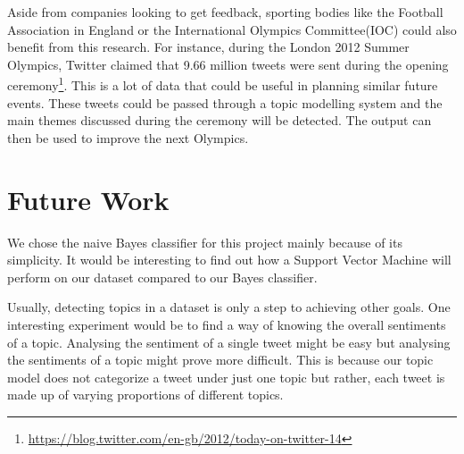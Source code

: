 Aside from companies looking to get feedback, sporting bodies like the Football Association in
England or the International Olympics Committee(IOC) could also benefit from this research. For
instance, during the London 2012 Summer Olympics, Twitter claimed that 9.66 million tweets were sent
during the opening ceremony\footnote{\url{https://blog.twitter.com/en-gb/2012/today-on-twitter-14}}.
This is a lot of data that could be useful in planning similar future events. These tweets could be
passed through a topic modelling system and the main themes discussed during the ceremony will be
detected. The output can then be used to improve the next Olympics.


\section{Future Work}
We chose the naive Bayes classifier for this project mainly because of its simplicity. It would be
interesting to find out how a Support Vector Machine will perform on our dataset compared to our
Bayes classifier.

Usually, detecting topics in a dataset is only a step to achieving other goals. One interesting
experiment would be to find a way of knowing the overall sentiments of a topic. Analysing the
sentiment of a single tweet might be easy but analysing the sentiments of a topic might prove more
difficult. This is because our topic model does not categorize a tweet under just one topic but
rather, each tweet is made up of varying proportions of different topics.

